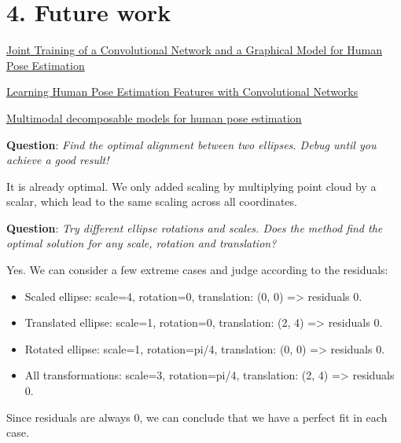 \documentclass[a4paper,11pt]{article}
\begin{document}
	\section{4. Future work}
\newpage
	\begin{thebibliography}{}
		\href{https://arxiv.org/abs/1406.2984}
		{Joint Training of a Convolutional Network and a Graphical Model for Human Pose Estimation}

		\href{https://arxiv.org/abs/1312.7302}
		{Learning Human Pose Estimation Features with Convolutional Networks}

		\href{https://homes.cs.washington.edu/~taskar/pubs/modec_cvpr13.pdf}
		{Multimodal decomposable models for human pose estimation}
	\end{thebibliography}
\newpage
\textbf{Question}: \textit{Find the optimal alignment between two ellipses. Debug until you achieve a good result!}

It is already optimal. We only added scaling by multiplying point cloud by a scalar, which lead to the same scaling across all coordinates.


\textbf{Question}: \textit{Try different ellipse rotations and scales. Does the method find the optimal solution for any scale, rotation and translation?}

Yes. We can consider a few extreme cases and judge according to the residuals:
\begin{itemize}
	\item Scaled ellipse: scale=4, rotation=0, translation: (0, 0) => residuals 0.
		
	\item Translated ellipse: scale=1, rotation=0, translation: (2, 4) => residuals 0.
		
	\item Rotated ellipse: scale=1, rotation=pi/4, translation: (0, 0) => residuals 0.
		
	\item All transformations: scale=3, rotation=pi/4, translation: (2, 4) => residuals 0.
\end{itemize}
Since residuals are always 0, we can conclude that we have a perfect fit in each case.
\end{document}
